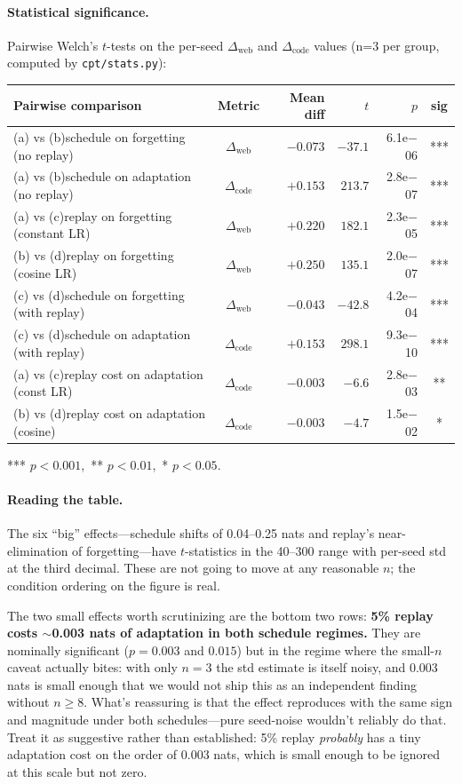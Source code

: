 \documentclass[10pt,letterpaper]{article}
\newcommand{\code}[1]{\texttt{\small #1}}
\begin{document}
\paragraph{Statistical significance.} Pairwise Welch's $t$-tests on the per-seed $\Delta_{\text{web}}$ and $\Delta_{\text{code}}$ values (n=3 per group, computed by \code{cpt/stats.py}):
\begin{center}\small
\begin{tabular}{lcrrrc}
\toprule
Pairwise comparison & Metric & Mean diff & $t$ & $p$ & sig \\
\midrule
(a) vs (b)\quad schedule on forgetting (no replay)   & $\Delta_{\text{web}}$  & $-0.073$ & $-37.1$ & 6.1e$-$06 & *** \\
(a) vs (b)\quad schedule on adaptation (no replay)   & $\Delta_{\text{code}}$ & $+0.153$ & $213.7$ & 2.8e$-$07 & *** \\
(a) vs (c)\quad replay on forgetting (constant LR)   & $\Delta_{\text{web}}$  & $+0.220$ & $182.1$ & 2.3e$-$05 & *** \\
(b) vs (d)\quad replay on forgetting (cosine LR)     & $\Delta_{\text{web}}$  & $+0.250$ & $135.1$ & 2.0e$-$07 & *** \\
(c) vs (d)\quad schedule on forgetting (with replay) & $\Delta_{\text{web}}$  & $-0.043$ & $-42.8$ & 4.2e$-$04 & *** \\
(c) vs (d)\quad schedule on adaptation (with replay) & $\Delta_{\text{code}}$ & $+0.153$ & $298.1$ & 9.3e$-$10 & *** \\
(a) vs (c)\quad replay cost on adaptation (const LR) & $\Delta_{\text{code}}$ & $-0.003$ & $-6.6$  & 2.8e$-$03 & ** \\
(b) vs (d)\quad replay cost on adaptation (cosine)   & $\Delta_{\text{code}}$ & $-0.003$ & $-4.7$  & 1.5e$-$02 & * \\
\bottomrule
\end{tabular}
\end{center}
*** $p < 0.001$, \,** $p < 0.01$, \,* $p < 0.05$.

\paragraph{Reading the table.} The six ``big'' effects---schedule shifts of 0.04--0.25 nats and replay's near-elimination of forgetting---have $t$-statistics in the 40--300 range with per-seed std at the third decimal. These are not going to move at any reasonable $n$; the condition ordering on the figure is real.

The two small effects worth scrutinizing are the bottom two rows: \textbf{5\% replay costs $\sim$0.003 nats of adaptation in both schedule regimes.} They are nominally significant ($p = 0.003$ and $0.015$) but in the regime where the small-$n$ caveat actually bites: with only $n=3$ the std estimate is itself noisy, and 0.003 nats is small enough that we would not ship this as an independent finding without $n \geq 8$. What's reassuring is that the effect reproduces with the same sign and magnitude under both schedules---pure seed-noise wouldn't reliably do that. Treat it as suggestive rather than established: 5\% replay \emph{probably} has a tiny adaptation cost on the order of 0.003 nats, which is small enough to be ignored at this scale but not zero.
\end{document}
